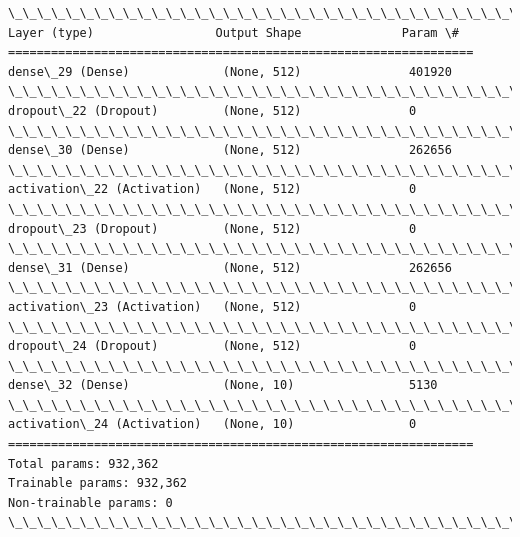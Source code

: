 \documentclass[11pt]{article}
\begin{document}
    \begin{Verbatim}[commandchars=\\\{\}]
\_\_\_\_\_\_\_\_\_\_\_\_\_\_\_\_\_\_\_\_\_\_\_\_\_\_\_\_\_\_\_\_\_\_\_\_\_\_\_\_\_\_\_\_\_\_\_\_\_\_\_\_\_\_\_\_\_\_\_\_\_\_\_\_\_
Layer (type)                 Output Shape              Param \#   
=================================================================
dense\_29 (Dense)             (None, 512)               401920    
\_\_\_\_\_\_\_\_\_\_\_\_\_\_\_\_\_\_\_\_\_\_\_\_\_\_\_\_\_\_\_\_\_\_\_\_\_\_\_\_\_\_\_\_\_\_\_\_\_\_\_\_\_\_\_\_\_\_\_\_\_\_\_\_\_
dropout\_22 (Dropout)         (None, 512)               0         
\_\_\_\_\_\_\_\_\_\_\_\_\_\_\_\_\_\_\_\_\_\_\_\_\_\_\_\_\_\_\_\_\_\_\_\_\_\_\_\_\_\_\_\_\_\_\_\_\_\_\_\_\_\_\_\_\_\_\_\_\_\_\_\_\_
dense\_30 (Dense)             (None, 512)               262656    
\_\_\_\_\_\_\_\_\_\_\_\_\_\_\_\_\_\_\_\_\_\_\_\_\_\_\_\_\_\_\_\_\_\_\_\_\_\_\_\_\_\_\_\_\_\_\_\_\_\_\_\_\_\_\_\_\_\_\_\_\_\_\_\_\_
activation\_22 (Activation)   (None, 512)               0         
\_\_\_\_\_\_\_\_\_\_\_\_\_\_\_\_\_\_\_\_\_\_\_\_\_\_\_\_\_\_\_\_\_\_\_\_\_\_\_\_\_\_\_\_\_\_\_\_\_\_\_\_\_\_\_\_\_\_\_\_\_\_\_\_\_
dropout\_23 (Dropout)         (None, 512)               0         
\_\_\_\_\_\_\_\_\_\_\_\_\_\_\_\_\_\_\_\_\_\_\_\_\_\_\_\_\_\_\_\_\_\_\_\_\_\_\_\_\_\_\_\_\_\_\_\_\_\_\_\_\_\_\_\_\_\_\_\_\_\_\_\_\_
dense\_31 (Dense)             (None, 512)               262656    
\_\_\_\_\_\_\_\_\_\_\_\_\_\_\_\_\_\_\_\_\_\_\_\_\_\_\_\_\_\_\_\_\_\_\_\_\_\_\_\_\_\_\_\_\_\_\_\_\_\_\_\_\_\_\_\_\_\_\_\_\_\_\_\_\_
activation\_23 (Activation)   (None, 512)               0         
\_\_\_\_\_\_\_\_\_\_\_\_\_\_\_\_\_\_\_\_\_\_\_\_\_\_\_\_\_\_\_\_\_\_\_\_\_\_\_\_\_\_\_\_\_\_\_\_\_\_\_\_\_\_\_\_\_\_\_\_\_\_\_\_\_
dropout\_24 (Dropout)         (None, 512)               0         
\_\_\_\_\_\_\_\_\_\_\_\_\_\_\_\_\_\_\_\_\_\_\_\_\_\_\_\_\_\_\_\_\_\_\_\_\_\_\_\_\_\_\_\_\_\_\_\_\_\_\_\_\_\_\_\_\_\_\_\_\_\_\_\_\_
dense\_32 (Dense)             (None, 10)                5130      
\_\_\_\_\_\_\_\_\_\_\_\_\_\_\_\_\_\_\_\_\_\_\_\_\_\_\_\_\_\_\_\_\_\_\_\_\_\_\_\_\_\_\_\_\_\_\_\_\_\_\_\_\_\_\_\_\_\_\_\_\_\_\_\_\_
activation\_24 (Activation)   (None, 10)                0         
=================================================================
Total params: 932,362
Trainable params: 932,362
Non-trainable params: 0
\_\_\_\_\_\_\_\_\_\_\_\_\_\_\_\_\_\_\_\_\_\_\_\_\_\_\_\_\_\_\_\_\_\_\_\_\_\_\_\_\_\_\_\_\_\_\_\_\_\_\_\_\_\_\_\_\_\_\_\_\_\_\_\_\_

    \end{Verbatim}
\end{document}
